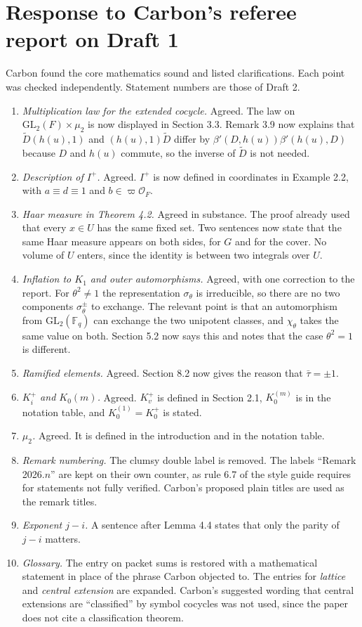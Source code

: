 \documentclass[12pt,letterpaper]{article}
\begin{document}
\section{Response to Carbon's referee report on Draft 1}\label{sec:carbon}
Carbon found the core mathematics sound and listed clarifications. Each point was checked independently. Statement numbers are those of Draft 2.
\begin{enumerate}
\item \emph{Multiplication law for the extended cocycle.} Agreed. The law on $\mathrm{GL}_2(F)\times\mu_2$ is now displayed in Section 3.3. Remark 3.9 now explains that $\widetilde D(h(u),1)$ and $(h(u),1)\widetilde D$ differ by $\beta'(D,h(u))\beta'(h(u),D)$ because $D$ and $h(u)$ commute, so the inverse of $\widetilde D$ is not needed.
\item \emph{Description of $I^+$.} Agreed. $I^+$ is now defined in coordinates in Example 2.2, with $a\equiv d\equiv1$ and $b\in\varpi\mathcal O_F$.
\item \emph{Haar measure in Theorem 4.2.} Agreed in substance. The proof already used that every $x\in U$ has the same fixed set. Two sentences now state that the same Haar measure appears on both sides, for $G$ and for the cover. No volume of $U$ enters, since the identity is between two integrals over $U$.
\item \emph{Inflation to $K_1$ and outer automorphisms.} Agreed, with one correction to the report. For $\theta^2\ne1$ the representation $\sigma_\theta$ is irreducible, so there are no two components $\sigma_\theta^\pm$ to exchange. The relevant point is that an automorphism from $\mathrm{GL}_2(\mathbb F_q)$ can exchange the two unipotent classes, and $\chi_\theta$ takes the same value on both. Section 5.2 now says this and notes that the case $\theta^2=1$ is different.
\item \emph{Ramified elements.} Agreed. Section 8.2 now gives the reason that $\bar\tau=\pm1$.
\item \emph{$K_i^+$ and $K_0(m)$.} Agreed. $K_v^+$ is defined in Section 2.1, $K_0^{(m)}$ is in the notation table, and $K_0^{(1)}=K_0^+$ is stated.
\item \emph{$\mu_2$.} Agreed. It is defined in the introduction and in the notation table.
\item \emph{Remark numbering.} The clumsy double label is removed. The labels ``Remark 2026.$n$'' are kept on their own counter, as rule 6.7 of the style guide requires for statements not fully verified. Carbon's proposed plain titles are used as the remark titles.
\item \emph{Exponent $j-i$.} A sentence after Lemma 4.4 states that only the parity of $j-i$ matters.
\item \emph{Glossary.} The entry on packet sums is restored with a mathematical statement in place of the phrase Carbon objected to. The entries for \emph{lattice} and \emph{central extension} are expanded. Carbon's suggested wording that central extensions are ``classified'' by symbol cocycles was not used, since the paper does not cite a classification theorem.
\end{enumerate}
\end{document}

